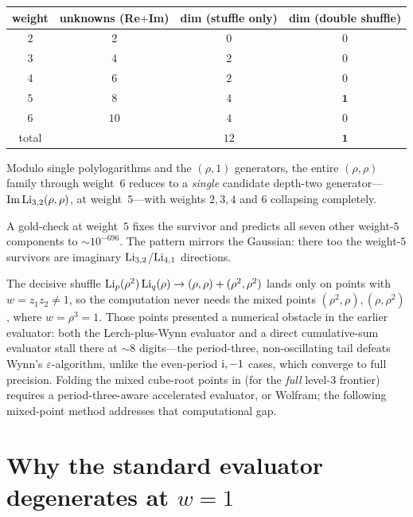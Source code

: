 \begin{center}
\renewcommand{\arraystretch}{1.2}
\begin{tabular}{c c c c}
\hline
weight & unknowns (Re$+$Im) & dim (stuffle only) & dim (double shuffle)\\
\hline
$2$ & $2$  & $0$ & $0$\\
$3$ & $4$  & $2$ & $0$\\
$4$ & $6$  & $2$ & $0$\\
$5$ & $8$  & $4$ & $\mathbf 1$\\
$6$ & $10$ & $4$ & $0$\\
\hline
total & & $12$ & $\mathbf 1$\\
\hline
\end{tabular}
\end{center}

\begin{observation}\label{double:thm:eis-1}
Modulo single polylogarithms and the $(\rho,1)$ generators, the entire $(\rho,\rho)$ family through
weight~$6$ reduces to a \emph{single} candidate depth-two generator---$\operatorname{Im}\operatorname{Li}_{3,2}(\rho,\rho)$, at
weight~$5$---with weights $2,3,4$ and $6$ collapsing completely.
\end{observation}

A gold-check at weight~$5$ fixes the survivor and predicts all seven other weight-$5$ components to
${\sim}10^{-696}$. The pattern mirrors the Gaussian: there too the weight-$5$ survivors are imaginary
$\operatorname{Li}_{3,2}$/$\operatorname{Li}_{4,1}$ directions.

\begin{remark}
The decisive shuffle $\operatorname{Li}_p(\rho^2)\operatorname{Li}_q(\rho)\to(\rho,\rho)+(\rho^2,\rho^2)$ lands only on points with
$w=z_1z_2\neq1$, so the computation never needs the mixed points $(\rho^2,\rho),(\rho,\rho^2)$, where
$w=\rho^3=1$. Those points presented a numerical obstacle in the earlier evaluator: both the
Lerch-plus-Wynn evaluator and a direct cumulative-sum evaluator stall there at ${\sim}8$ digits---the
period-three, non-oscillating tail defeats Wynn's $\varepsilon$-algorithm, unlike the even-period
$\mathrm{i},-1$ cases, which converge to full precision. Folding the mixed cube-root points in (for the
\emph{full} level-$3$ frontier) requires a period-three-aware accelerated evaluator, or Wolfram; the following mixed-point method addresses that computational gap.
\end{remark}
\section{Why the standard evaluator degenerates at \texorpdfstring{$w=1$}{w=1}}\label{mixed:sec:why}

